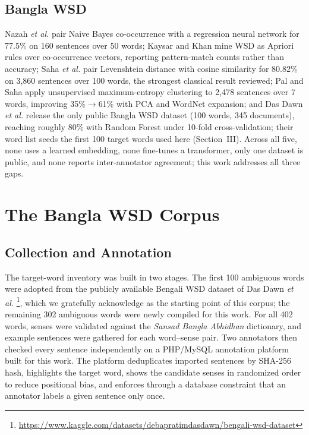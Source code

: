 \documentclass[conference]{IEEEtran}
\begin{document}
\subsection{Bangla WSD}
Nazah \emph{et al.} \cite{nazah2017} pair Naive Bayes co-occurrence with a regression neural network for 77.5\% on 160 sentences over 50 words; Kaysar and Khan \cite{kaysarkhan2018} mine WSD as Apriori rules over co-occurrence vectors, reporting pattern-match counts rather than accuracy; Saha \emph{et al.} \cite{sahamoumittra2019} pair Levenshtein distance with cosine similarity for 80.82\% on 3,860 sentences over 100 words, the strongest classical result reviewed; Pal and Saha \cite{palsaha2019} apply unsupervised maximum-entropy clustering to 2,478 sentences over 7 words, improving 35\%$\to$61\% with PCA and WordNet expansion; and Das Dawn \emph{et al.} \cite{dasdawn2023} release the only public Bangla WSD dataset (100 words, 345 documents), reaching roughly 80\% with Random Forest under 10-fold cross-validation; their word list seeds the first 100 target words used here (Section~III). Across all five, none uses a learned embedding, none fine-tunes a transformer, only one dataset is public, and none reports inter-annotator agreement; this work addresses all three gaps.

\section{The Bangla WSD Corpus}
\subsection{Collection and Annotation}
The target-word inventory was built in two stages. The first 100 ambiguous words were adopted from the publicly available Bengali WSD dataset of Das Dawn \emph{et al.} \cite{dasdawn2023}\footnote{\url{https://www.kaggle.com/datasets/debapratimdasdawn/bengali-wsd-dataset}}, which we gratefully acknowledge as the starting point of this corpus; the remaining 302 ambiguous words were newly compiled for this work. For all 402 words, senses were validated against the \emph{Sansad Bangla Abhidhan} dictionary, and example sentences were gathered for each word--sense pair. Two annotators then checked every sentence independently on a PHP/MySQL annotation platform built for this work. The platform deduplicates imported sentences by SHA-256 hash, highlights the target word, shows the candidate senses in randomized order to reduce positional bias, and enforces through a database constraint that an annotator labels a given sentence only once.
\end{document}
